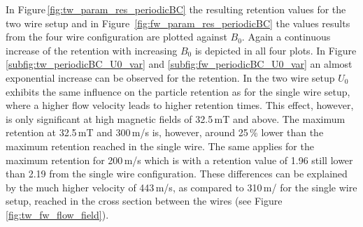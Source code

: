 In Figure\,\ref{fig:tw_param_res_periodicBC} the resulting retention values for the two wire setup and in Figure \,\ref{fig:fw_param_res_periodicBC} the values results from the four wire configuration are plotted against $B_{0}$. Again a continuous increase of the retention with increasing $B_{0}$ is depicted in all four plots. In Figure \ref{subfig:tw_periodicBC_U0_var} and \ref{subfig:fw_periodicBC_U0_var} an almost exponential increase can be observed for the retention. In the two wire setup $U_{0}$ exhibits the same influence on the particle retention as for the single wire setup, where a higher flow velocity leads to higher retention times. This effect, however, is only significant at high magnetic fields of 32.5\,mT and above. The maximum retention at 32.5\,mT and 300\,\textmu m/s is, however, around 25\,\% lower than the maximum retention reached in the single wire. The same applies for the maximum retention for 200\,\textmu m/s which is with a retention value of 1.96 still lower than 2.19 from the single wire configuration. These differences can be explained by the much higher velocity of 443\,\textmu m/s, as compared to 310\,\textmu m/ for the single wire setup, reached in the cross section between the wires (see Figure \ref{fig:tw_fw_flow_field}).

